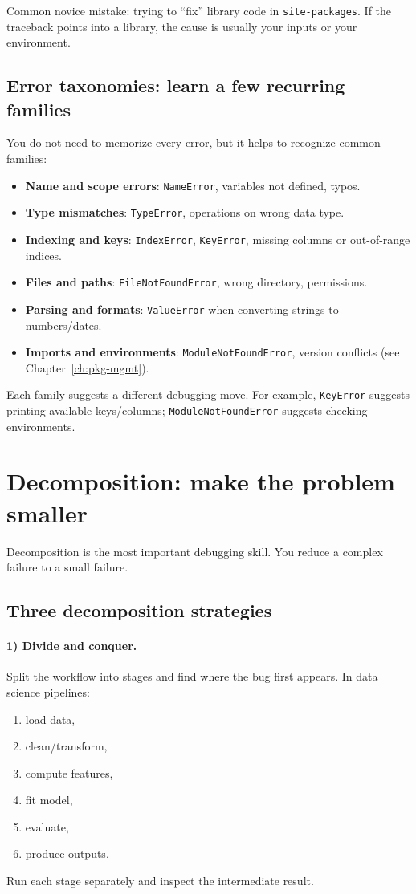 Common novice mistake: trying to ``fix'' library code in \texttt{site-packages}. If the traceback points into a library, the cause is usually your inputs or your environment.

\subsection{Error taxonomies: learn a few recurring families}
You do not need to memorize every error, but it helps to recognize common families:
\begin{itemize}[noitemsep]
  \item \textbf{Name and scope errors}: \texttt{NameError}, variables not defined, typos.
  \item \textbf{Type mismatches}: \texttt{TypeError}, operations on wrong data type.
  \item \textbf{Indexing and keys}: \texttt{IndexError}, \texttt{KeyError}, missing columns or out-of-range indices.
  \item \textbf{Files and paths}: \texttt{FileNotFoundError}, wrong directory, permissions.
  \item \textbf{Parsing and formats}: \texttt{ValueError} when converting strings to numbers/dates.
  \item \textbf{Imports and environments}: \texttt{ModuleNotFoundError}, version conflicts (see Chapter~\ref{ch:pkg-mgmt}).
\end{itemize}

Each family suggests a different debugging move. For example, \texttt{KeyError} suggests printing available keys/columns; \texttt{ModuleNotFoundError} suggests checking environments.

\section{Decomposition: make the problem smaller}
Decomposition is the most important debugging skill. You reduce a complex failure to a small failure.

\subsection{Three decomposition strategies}
\paragraph{1) Divide and conquer.} Split the workflow into stages and find where the bug first appears. In data science pipelines:
\begin{enumerate}[noitemsep]
  \item load data,
  \item clean/transform,
  \item compute features,
  \item fit model,
  \item evaluate,
  \item produce outputs.
\end{enumerate}
Run each stage separately and inspect the intermediate result.

